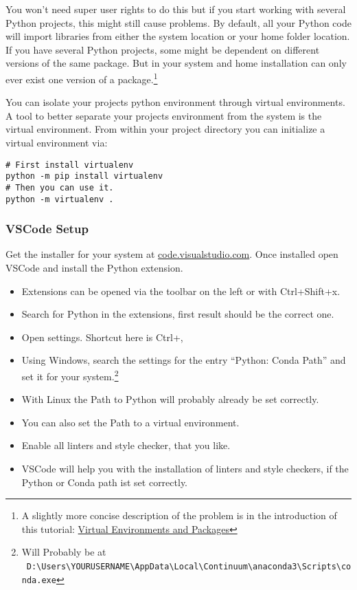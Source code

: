 \documentclass{article}
\begin{document}
You won't need super user rights to do this but if you start working with several Python projects,
this might still cause problems.
By default, all your Python code will import libraries from either the system location
or your home folder location.
If you have several Python projects, some might be dependent on different versions of the
same package.
But in your system and home installation can only ever exist one version of a package.\footnote{
    A slightly more concise description of the problem is in the introduction of this tutorial:
    \href{https://docs.python.org/3/tutorial/venv.html}{Virtual Environments and Packages}
}

You can isolate your projects python environment through virtual environments.
A tool to better separate your projects environment from the system is the virtual environment.
From within your project directory you can initialize a virtual environment via:

\begin{lstlisting}
# First install virtualenv
python -m pip install virtualenv
# Then you can use it.
python -m virtualenv .
\end{lstlisting}


\subsubsection{VSCode Setup}

Get the installer for your system at
\href{https://code.visualstudio.com/}{code.visualstudio.com}.
Once installed open VSCode and install the Python extension.
\begin{itemize}
    \item Extensions can be opened via the toolbar on the left or with Ctrl+Shift+x.
    \item Search for Python in the extensions, first result should be the correct one.
    \item Open settings. Shortcut here is Ctrl+,
    \item Using Windows, search the settings for the entry
          ``Python: Conda Path'' and set it for your system.\footnote{Will Probably be at\\ \
              \verb!D:\Users\YOURUSERNAME\AppData\Local\Continuum\anaconda3\Scripts\conda.exe! }
    \item With Linux the Path to Python will probably already be set correctly.
    \item You can also set the Path to a virtual environment.
    \item Enable all linters and style checker, that you like.
    \item VSCode will help you with the installation of linters and style checkers,
          if the Python or Conda path ist set correctly.
\end{itemize}
\end{document}
